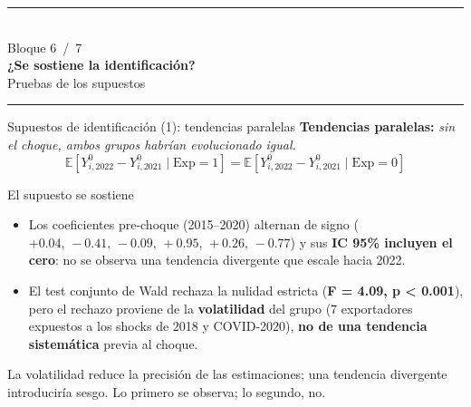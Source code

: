 \documentclass[aspectratio=169,10pt]{beamer}
\newcommand{\key}[1]{{\bfseries\color{AcentoRojo}#1}}
\newcommand{\divisor}[3]{%
  {\setbeamertemplate{footline}{}%
   \begin{frame}[plain]
     \vfill
     \begin{center}
       {\color{AcentoRojo}\rule{2.6cm}{1.2pt}}\\[0.7em]
       {\scriptsize\color{GrisMedio}Bloque #1 \,/\, 7}\\[0.6em]
       {\Large\color{Carbon}\bfseries #2}\\[0.45em]
       {\color{GrisMedio}#3}\\[0.7em]
       {\color{AcentoRojo}\rule{2.6cm}{1.2pt}}
     \end{center}
     \vfill
   \end{frame}}}
\begin{document}
\divisor{6}{¿Se sostiene la identificación?}{Pruebas de los supuestos}

\begin{frame}{Supuestos de identificación (1): tendencias paralelas}
  \footnotesize
  \textbf{Tendencias paralelas:} \emph{sin el choque, ambos grupos habrían evolucionado igual.}
  \[
    \mathbb{E}[Y^0_{i,2022}-Y^0_{i,2021}\mid \text{Exp}{=}1]
    = \mathbb{E}[Y^0_{i,2022}-Y^0_{i,2021}\mid \text{Exp}{=}0]
  \]
  \begin{block}{El supuesto se sostiene}
    \begin{itemize}
      \item Los coeficientes pre-choque (2015--2020) alternan de signo
            ($+0.04,\,-0.41,\,-0.09,\,+0.95,\,+0.26,\,-0.77$) y sus \textbf{IC 95\% incluyen el cero}:
            no se observa una tendencia divergente que escale hacia 2022.
      \item El test conjunto de Wald \alert{rechaza} la nulidad estricta
            (\key{F = 4.09, p < 0.001}), pero el rechazo proviene de la \textbf{volatilidad}
            del grupo (7 exportadores expuestos a los shocks de 2018 y COVID-2020),
            \textbf{no de una tendencia sistemática} previa al choque.
    \end{itemize}
  \end{block}
  \centering\footnotesize\color{GrisMedio}
  La volatilidad reduce la precisión de las estimaciones; una tendencia divergente introduciría sesgo. Lo primero se observa; lo segundo, no.

\end{frame}
\end{document}
